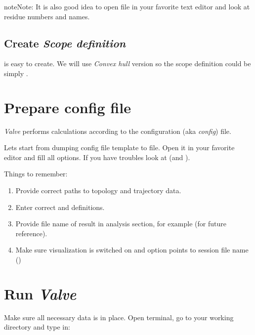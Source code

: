 \documentclass[a4paper,10pt,english]{sphinxmanual}
\begin{document}
\begin{notice}{note}{Note:}
It is also good idea to open  file in your favorite text editor and look at residue numbers and names.
\end{notice}


\subsection{Create \emph{Scope definition}}
\label{valve/valve_tutorial:create-scope-definition}
{\hyperref[valve/valve_manual:scope\string-definition]{}} is easy to create. We will use \emph{Convex hull} version so the scope definition could be simply .


\section{Prepare config file}
\label{valve/valve_tutorial:prepare-config-file}
\emph{Valve} performs calculations according to the configuration (aka \emph{config}) file.

Lets start from dumping config file template to  file. Open it in your favorite editor and fill all options.
If you have troubles look at {\hyperref[valve/valve_config::doc]{}} (and {\hyperref[valve/valve_manual::doc]{}}).

Things to remember:
\begin{enumerate}
\item {} 
Provide correct paths to topology and trajectory data.

\item {} 
Enter correct {\hyperref[valve/valve_manual:object\string-definition]{}} and {\hyperref[valve/valve_manual:scope\string-definition]{}} definitions.

\item {} 
Provide file name of result in analysis section, for example  (for future reference).

\item {} 
Make sure visualization is switched on and  option points to session file name ()

\end{enumerate}


\section{Run \emph{Valve}}
\label{valve/valve_tutorial:run-valve}
Make sure all necessary data is in place. Open terminal, go to your working directory and type in:
\end{document}
